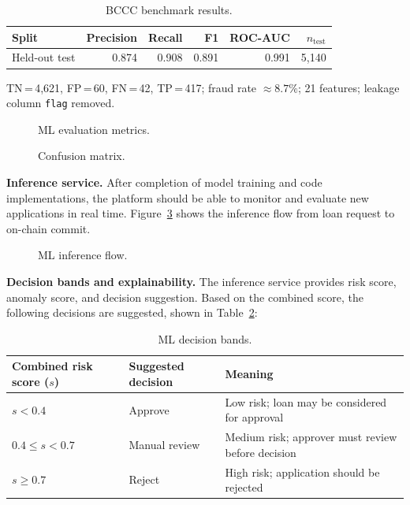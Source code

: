\begin{table}[H]
\centering
\caption[BCCC benchmark results]{BCCC benchmark results.}
\label{tab:ml-bccc-results}
\begin{tabular}{lrrrrr}
\toprule
\tableheadcolor
\textbf{Split} & \textbf{Precision} & \textbf{Recall} & \textbf{F1} & \textbf{ROC-AUC} & \textbf{$n_{\text{test}}$} \\
\midrule
Held-out test & 0.874 & 0.908 & 0.891 & 0.991 & 5{,}140 \\
\bottomrule
\end{tabular}

\vspace{4pt}
\footnotesize TN\,=\,4{,}621, FP\,=\,60, FN\,=\,42, TP\,=\,417; fraud rate ${\approx}8.7\%$; 21 features; leakage column \texttt{flag} removed.
\end{table}

\begin{figure}[H]
\centering
{}
\caption[ML evaluation metrics]{ML evaluation metrics.}
\label{fig:ml-eval}
\end{figure}

\begin{figure}[H]
\centering
{}
\caption[Confusion matrix]{Confusion matrix.}
\label{fig:ml-confusion-matrix}
\end{figure}

\textbf{Inference service.} After completion of model training and code implementations, the platform should be able to monitor and evaluate new applications in real time. Figure~\ref{fig:ml-inference-service} shows the inference flow from loan request to on-chain commit.

\begin{figure}[H]
\centering
{}
\caption[ML inference flow]{ML inference flow.}
\label{fig:ml-inference-service}
\end{figure}

\textbf{Decision bands and explainability.} The inference service provides risk score, anomaly score, and decision suggestion. Based on the combined score, the following decisions are suggested, shown in Table~\ref{tab:ml-decision-bands}:

\begin{table}[H]
\centering
\caption[ML decision bands]{ML decision bands.}
\label{tab:ml-decision-bands}
\small
\begin{tabular}{@{}p{3.6cm}p{3.2cm}p{6.8cm}@{}}
\toprule
\tableheadcolor
\textbf{Combined risk score ($s$)} & \textbf{Suggested decision} & \textbf{Meaning} \\
\midrule
$s < 0.4$ & Approve & Low risk; loan may be considered for approval \\
$0.4 \le s < 0.7$ & Manual review & Medium risk; approver must review before decision \\
$s \ge 0.7$ & Reject & High risk; application should be rejected \\
\bottomrule
\end{tabular}
\end{table}


